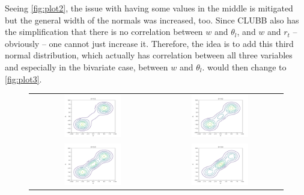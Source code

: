 Seeing \cref{fig:plot2},
the issue with having some values in the middle is mitigated
but the general width of the normals was increased, too.
Since \gls{CLUBB} also has the simplification
that there is no correlation between $w$ and $\theta_l$,
and $w$ and $r_t$ -- obviously -- one cannot just increase it.
Therefore, the idea is to add this third normal distribution,
which actually has correlation between all three variables
and especially in the bivariate case, between $w$ and $\theta_l$.
 would then change to \cref{fig:plot3}.
\begin{figure}[!htb]
    \centering
    \begin{tabular}{cc}
        \multicolumn{1}{c}{\includegraphics[width=0.47\textwidth]{include/figures/plot3_1}} &
        \multicolumn{1}{c}{\includegraphics[width=0.47\textwidth]{include/figures/plot3_2}} \\
        \multicolumn{1}{c}{\includegraphics[width=0.47\textwidth]{include/figures/plot3_3}} &
        \multicolumn{1}{c}{\includegraphics[width=0.47\textwidth]{include/figures/plot3_4}} \\

\end{tabular}
\end{figure}
